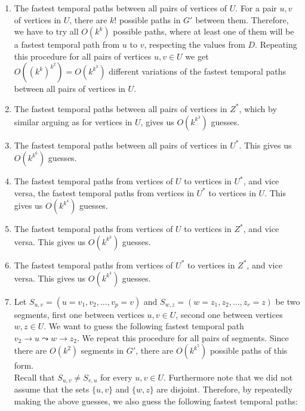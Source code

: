 \documentclass[a4paper,UKenglish,cleveref, autoref, thm-restate]{lipics-v2021}
\newcommand{\deltaExact}{\textsc{Periodic TGR}}
\begin{document}
\begin{enumerate}[G-1.]
    \item \label{FPT-guessFTPamongU}
    The fastest temporal paths between all pairs of vertices of $U$.
    For a pair $u,v$ of vertices in $U$, there are $k!$ possible paths in $G'$ between them. 
    Therefore, we have to try all $O(k^k)$ possible paths, where at least one of them will be a fastest temporal path from $u$ to $v$, respecting the values from $D$.
    Repeating this procedure for all pairs of vertices $u,v \in U$ we get $O((k^k)^{k^2})=O(k^{k^3})$ different variations of the fastest temporal paths between all pairs of vertices in $U$.
    \item \label{FPT-guessFTPamongZstar}
    The fastest temporal paths between all pairs of vertices in $Z^*$, 
    which by similar arguing as for vertices in $U$, gives us $O(k^{k^3})$ guesses.
    \item \label{FPT-guessFTPamongUstar}
    The fastest temporal paths between all pairs of vertices in $U^*$.
    This gives us $O(k^{k^6})$ guesses.
    \item \label{FPT-guessFTPamongUandUstar}
    The fastest temporal paths from vertices of $U$ to vertices in $U^*$,
    and vice versa, the fastest temporal paths from vertices in $U^*$ to vertices in $U$.
    This gives us $O(k^{k^4})$ guesses.
    \item \label{FPT-guessFTPamongUandZstar}
    The fastest temporal paths from vertices of $U$ to vertices in $Z^*$,
    and vice versa.
    This gives us $O(k^{k^3})$ guesses.
    \item \label{FPT-guessFTPamongUstarandZstar}
    The fastest temporal paths from vertices of $U^*$ to vertices in $Z^*$,
    and vice versa.
    This gives us $O(k^{k^4})$ guesses.
    \item \label{FPT-guessFTPamongv2z2}
    Let $S_{u,v} = (u=v_1,v_2, \dots, v_p = v)$ and $S_{w,z} = (w=z_1,z_2, \dots, z_r = z)$ be two segments,
    first one between vertices $u,v \in U$, second one between vertices $w, z \in U$.
    We want to guess the following fastest temporal path
    $v_2 \rightarrow u \leadsto w \rightarrow z_2$. 
    We repeat this procedure for all pairs of segments.
    Since there are $O(k^2)$ segments in $G'$,
    there are $O(k^{k^5})$ possible paths of this form. \\
    Recall that $S_{u,v}\neq S_{v,u}$ for every $u,v\in U$. Furthermore note that we did not assume that the sets $\{u,v\}$ and $\{w,z\}$ are disjoint. Therefore, by repeatedly making the above guesses, we also guess the following fastest temporal paths: 

\end{enumerate}
\end{document}

